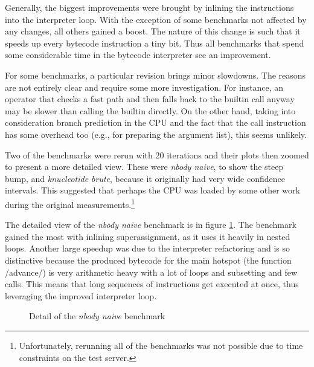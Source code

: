 Generally, the biggest improvements were brought by inlining the instructions into the interpreter loop. With the exception of some benchmarks not affected by any changes, all others gained a boost. The nature of this change is such that it speeds up every bytecode instruction a tiny bit. Thus all benchmarks that spend some considerable time in the bytecode interpreter see an improvement.

For some benchmarks, a particular revision brings minor slowdowns. The reasons are not entirely clear and require some more investigation. For instance, an operator that checks a fast path and then falls back to the builtin call anyway may be slower than calling the builtin directly. On the other hand, taking into consideration branch prediction in the CPU and the fact that the call instruction has some overhead too (e.g., for preparing the argument list), this seems unlikely.

Two of the benchmarks were rerun with 20 iterations and their plots then zoomed to present a more detailed view. These were \emph{nbody naive}, to show the steep bump, and \emph{knucleotide brute}, because it originally had very wide confidence intervals. This suggested that perhaps the CPU was loaded by some other work during the original measurements.\footnote{Unfortunately, rerunning all of the benchmarks was not possible due to time constraints on the test server.}

The detailed view of the \emph{nbody naive} benchmark is in figure \ref{fig:nbody}. The benchmark gained the most with inlining superassignment, as it uses it heavily in nested loops. Another large speedup was due to the interpreter refactoring and is so distinctive because the produced bytecode for the main hotspot (the function \rinline/advance/) is very arithmetic heavy with a lot of loops and subsetting and few calls. This means that long sequences of instructions get executed at once, thus leveraging the improved interpreter loop.

\begin{figure}[htbp]
  \caption{\label{fig:nbody}Detail of the \emph{nbody naive} benchmark}
  \centering
\end{figure}

